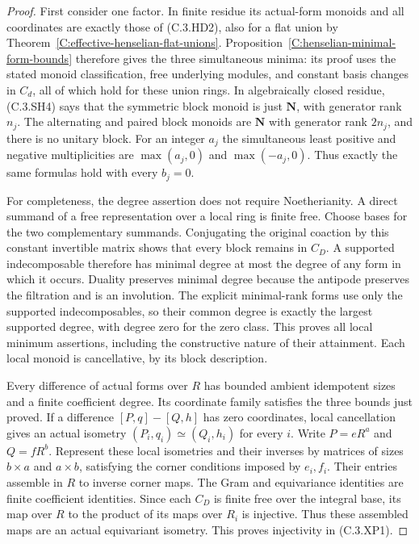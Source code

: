 \begin{proof}
First consider one factor.  In finite residue its
actual-form monoids and all coordinates are exactly
those of (C.3.HD2), also for a flat union by
Theorem~\ref{C:effective-henselian-flat-unions}.
Proposition~\ref{C:henselian-minimal-form-bounds}
therefore gives the three simultaneous minima: its
proof uses the stated monoid classification, free
underlying modules, and constant basis changes in
$C_d$, all of which hold for these union rings.
In algebraically closed residue, (C.3.SH4) says that
the symmetric block monoid is just $\mathbf N$, with
generator rank $n_j$.  The alternating and paired
block monoids are $\mathbf N$ with generator rank
$2n_j$, and there is no unitary block.
For an integer $a_j$ the simultaneous least positive
and negative multiplicities are
$\max(a_j,0)$ and $\max(-a_j,0)$.
Thus exactly the same formulas hold with every $b_j=0$.

For completeness, the degree assertion does not
require Noetherianity.  A direct summand of a free
representation over a local ring is finite free.
Choose bases for the two complementary summands.
Conjugating the original coaction by this constant
invertible matrix shows that every block remains
in $C_D$.  A supported indecomposable therefore has
minimal degree at most the degree of any form in
which it occurs.  Duality preserves minimal degree
because the antipode preserves the filtration and
is an involution.  The explicit minimal-rank forms
use only the supported indecomposables, so their
common degree is exactly the largest supported
degree, with degree zero for the zero class.
This proves all local minimum assertions, including
the constructive nature of their attainment.
Each local monoid is cancellative, by its block
description.

Every difference of actual forms over $R$ has bounded
ambient idempotent sizes and a finite coefficient
degree.  Its coordinate family satisfies the three
bounds just proved.
If a difference $[P,q]-[Q,h]$ has zero coordinates,
local cancellation gives an actual isometry
$(P_i,q_i)\simeq(Q_i,h_i)$ for every $i$.
Write $P=eR^a$ and $Q=fR^b$.  Represent these local
isometries and their inverses by matrices of sizes
$b\times a$ and $a\times b$, satisfying the corner
conditions imposed by $e_i,f_i$.
Their entries assemble in $R$ to inverse corner
maps.  The Gram and equivariance identities are
finite coefficient identities.  Since each $C_D$
is finite free over the integral base, its map over
$R$ to the product of its maps over $R_i$ is
injective.  Thus these assembled maps are an
actual equivariant isometry.  This proves
injectivity in (C.3.XP1).


\end{proof}

